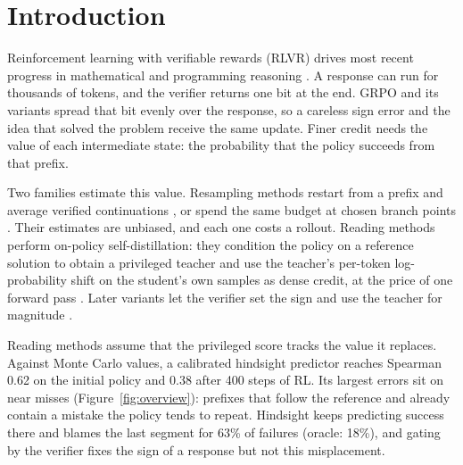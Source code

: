 \documentclass[11pt]{article}
\theoremstyle{remark}
\begin{document}
\section{Introduction}

Reinforcement learning with verifiable rewards (RLVR) drives most recent progress in mathematical and programming reasoning \citep{guo2025deepseekr1,yu2025dapo}. A response can run for thousands of tokens, and the verifier returns one bit at the end. GRPO \citep{shao2024deepseekmath} and its variants spread that bit evenly over the response, so a careless sign error and the idea that solved the problem receive the same update. Finer credit needs the value of each intermediate state: the probability that the policy succeeds from that prefix.

Two families estimate this value. Resampling methods restart from a prefix and average verified continuations \citep{kazemnejad2025vineppo}, or spend the same budget at chosen branch points \citep{hou2025treerl,samanta2026resets}. Their estimates are unbiased, and each one costs a rollout. Reading methods perform on-policy self-distillation: they condition the policy on a reference solution to obtain a privileged teacher and use the teacher's per-token log-probability shift on the student's own samples as dense credit, at the price of one forward pass \citep{zhao2026opsd,hubotter2026sdpo}. Later variants let the verifier set the sign and use the teacher for magnitude \citep{yang2026rlsd,li2026hsd,huang2026flowbalance}.

Reading methods assume that the privileged score tracks the value it replaces. Against Monte Carlo values, a calibrated hindsight predictor reaches Spearman 0.62 on the initial policy and 0.38 after 400 steps of RL. Its largest errors sit on near misses (Figure~\ref{fig:overview}): prefixes that follow the reference and already contain a mistake the policy tends to repeat. Hindsight keeps predicting success there and blames the last segment for 63\% of failures (oracle: 18\%), and gating by the verifier fixes the sign of a response but not this misplacement.
\end{document}
